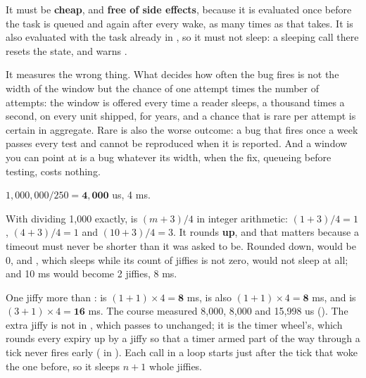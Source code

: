  It must be \textbf{cheap}, and \textbf{free of side effects}, because it is evaluated once
before the task is queued and again after every wake, as many times as that takes. It is also
evaluated with the task already in , so it must not sleep: a sleeping call
there resets the state, and  warns .

 It measures the wrong thing. What decides how often the bug fires is not the width of the
window but the chance of one attempt times the number of attempts: the window is offered every time
a reader sleeps, a thousand times a second, on every unit shipped, for years, and a chance that is
rare per attempt is certain in aggregate. Rare is also the worse outcome: a bug that fires once a
week passes every test and cannot be reproduced when it is reported. And a window you can point at
is a bug whatever its width, when the fix, queueing before testing, costs nothing.


 $1{,}000{,}000 / 250 = \mathbf{4{,}000}$ us, 4 ms.

 With  dividing 1,000 exactly,  is $(m + 3) / 4$ in
integer arithmetic: $(1 + 3)/4 = 1$, $(4 + 3)/4 = 1$ and $(10 + 3)/4 = 3$. It rounds \textbf{up},
and that matters because a timeout must never be shorter than it was asked to be. Rounded down,
 would be 0, and , which sleeps while its count of
jiffies is not zero, would not sleep at all; and 10 ms would become 2 jiffies, 8 ms.

 One jiffy more than :  is $(1 + 1) \times 4 =
\mathbf{8}$ ms,  is also $(1 + 1) \times 4 = \mathbf{8}$ ms, and  is
$(3 + 1) \times 4 = \mathbf{16}$ ms. The course measured 8,000, 8,000 and 15,998 us
(). The extra jiffy is not in , which passes
 to  unchanged; it is the timer wheel's, which
rounds every expiry up by a jiffy so that a timer armed part of the way through a tick never fires
early ( in ). Each call in a loop starts just after the
tick that woke the one before, so it sleeps $n + 1$ whole jiffies.

